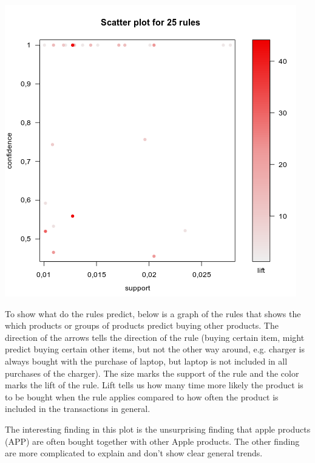 \documentclass[12pt,a4paper,leqno]{report}
\theoremstyle{plain}
\theoremstyle{definition}
\theoremstyle{remark}
\begin{document}
\bigskip
{
    \centering
    \includegraphics[width=\textwidth,height=\textheight,keepaspectratio]{apriori_brand_level_plot.png}
    \par
}
\bigskip

To show what do the rules predict, below is a graph of the rules that
shows the which products or groups of products predict buying other products.
The direction of the arrows tells the direction of the rule (buying certain item,
might predict buying certain other items, but not the other way around, e.g. charger is always
bought with the purchase of laptop, but laptop is not included in all purchases of the charger).
The size marks the support of the rule and the color marks the lift of the rule. Lift
tells us how many time more likely the product is to be bought when the rule applies
compared to how often the product is included in the transactions in general.

The interesting finding in this plot is the unsurprising finding that apple products (APP)
are often bought together with other Apple products. The other finding are more complicated
to explain and don't show clear general trends.
\end{document}
